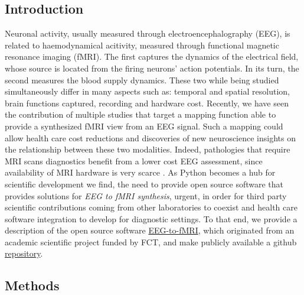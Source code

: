 \subsection{Introduction}\label{section:introduction}


Neuronal activity, usually measured through electroencephalography (EEG), is related to haemodynamical acitivity, measured through functional magnetic resonance imaging (fMRI). The first captures the dynamics of the electrical field, whose source is located from the firing neurons' action potentials. In its turn, the second measures the blood supply dynamics. These two while being studied simultaneously \cite{shibasaki2008human,yu2016building,he2018spatialtemporaldo,rojas2018study,brechet2019capturing,daly2019electroencephalography,cury2020sparse,abreu2021eeg} differ in many aspects such as: temporal and spatial resolution, brain functions captured, recording and hardware cost. Recently, we have seen the contribution of multiple studies that target a mapping function able to provide a synthesized fMRI view from an EEG signal. Such a mapping could allow health care cost reductions and discoveries of new neuroscience insights on the relationship between these two modalities. Indeed, pathologies that require MRI scans diagnostics benefit from a lower cost EEG assessment, since availability of MRI hardware is very scarce \cite{ogbole2018survey}. As Python \cite{van1995python} becomes a hub for scientific development \cite{harris2020array,virtanen2020scipy,abadi2016tensorflow} we find, the need to provide open source software that provides solutions for \textit{EEG to fMRI synthesis}, urgent, in order for third party scientific contributions coming from other laboratories to coexist and health care software integration to develop for diagnostic settings. To that end, we provide a description of the open source software \href{https://pypi.org/project/eeg-to-fmri/}{EEG-to-fMRI}, which originated from an academic scientific project funded by FCT, and make publicly available a github \href{https://github.com/eeg-to-fmri/eeg-to-fmri}{repository}.

\subsection{Methods}\label{section:methods}

